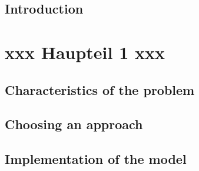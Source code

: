 \documentclass[
    fontsize=10pt,    %
    a4paper,      %
    parskip=half-,    %
    twoside,      %
    headings=big,  %
    appendixprefix=true,
    ]{scrreprt}    %
\begin{document}
\clearpage

\clearpage


\cleardoublepage
\pagestyle{fancy}



\chapter{Introduction}\label{chapter:einleitung}


\cleardoublepage
\part{xxx Haupteil 1 xxx}\label{part:xxx-haupteil1-xxx}

%

\chapter{Characteristics of the problem}\label{chapter:xxxname1xxx}
%


\chapter{Choosing an approach}\label{chapter:xxxname2xxx}
%


\chapter{Implementation of the model}\label{chapter:xxxname3xxx}
%




\end{document}
